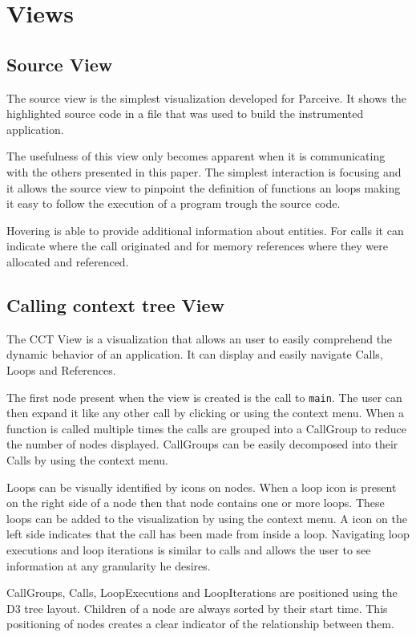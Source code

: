 \section{Views}

\subsection{Source View}

The source view is the simplest visualization developed for Parceive. It shows
the highlighted source code in a file that was used to build the instrumented
application.

The usefulness of this view only becomes apparent when it is communicating with
the others presented in this paper. The simplest interaction is focusing and it
allows the source view to pinpoint the definition of functions an loops making
it easy to follow the execution of a program trough the source code.

Hovering is able to provide additional information about entities. For calls it
can indicate where the call originated and for memory references where they
were allocated and referenced.

\subsection{Calling context tree View}

The CCT View is a visualization that allows an user to easily comprehend the
dynamic behavior of an application. It can display and easily navigate Calls,
Loops and References.

The first node present when the view is created is the call to \texttt{main}.
The user can then expand it like any other call by clicking or using the
context menu. When a function is called multiple times the calls are grouped
into a CallGroup to reduce the number of nodes displayed. CallGroups can be
easily decomposed into their Calls by using the context menu.

Loops can be visually identified by icons on nodes. When a loop icon is present
on the right side of a node then that node contains one or more loops. These
loops can be added to the visualization by using the context menu. A icon on
the left side indicates that the call has been made from inside a loop.
Navigating loop executions and loop iterations is similar to calls and allows
the user to see information at any granularity he desires.

CallGroups, Calls, LoopExecutions and LoopIterations are positioned using the
D3 tree layout. Children of a node are always sorted by their start time. This
positioning of nodes creates a clear indicator of the relationship between
them.

